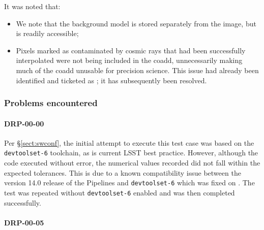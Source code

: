 \documentclass[DM,lsstdraft,STR,toc]{lsstdoc}
\begin{document}
It was noted that:

\begin{itemize}

  \item{We note that the background model is stored separately from the image, but is readily accessible;}
  \item{
    Pixels marked as contaminated by cosmic rays that had been successfully interpolated were not being included in the coadd, unnecessarily making much of the coadd unusable for precision science.
    This issue had already been identified and ticketed as ; it has subsequently been resolved.
  }

\end{itemize}

\subsubsection{Problems encountered}

\paragraph{DRP-00-00}
\label{sect:problems-drp-00-00}

Per \S\ref{sect:swconf}, the initial attempt to execute this test case was based on the \texttt{devtoolset-6} toolchain, as is current LSST best practice.
However, although the code executed without error, the numerical values recorded did not fall within the expected tolerances.
This is due to a known compatibility issue between the version 14.0 release of the Pipelines and \texttt{devtoolset-6} which was fixed on .
The test was repeated without \texttt{devtoolset-6} enabled and was then completed successfully.

\paragraph{DRP-00-05}
\label{sect:problems-drp-00-05}
\end{document}
